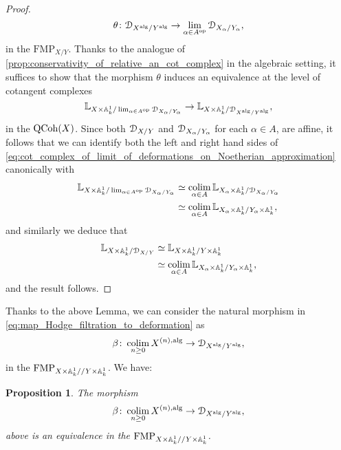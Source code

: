 \documentclass[10pt,a4paper,reqno]{amsart} %
\theoremstyle{plain}
\newtheorem{prop}[thm]{Proposition}
\theoremstyle{definition}
\theoremstyle{remark}
\numberwithin{equation}{section}
\begin{document}
\begin{proof}
        \[\theta \colon \mathcal D_{X^\mathrm{alg}/ Y^\mathrm{alg}} \to \lim_{\alpha \in A^\mathrm{op}} \mathcal D_{X_\alpha/ Y_\alpha},\]
    in the \infcat $\mathrm{FMP}_{X/ Y}$. Thanks to the analogue of \cref{prop:conservativity_of_relative_an_cot_complex} in the algebraic setting, it suffices to show that
    the morphism $\theta$ induces an equivalence at the level of cotangent complexes
        \begin{equation} \label{eq:cot_complex_of_limit_of_deformations_on_Noetherian_approximation}
            \mathbb L_{X \times \mathbb A^1_k / \lim_{\alpha \in A^\mathrm{op}} \mathcal D_{X_\alpha/ Y_\alpha}} \to \mathbb L_{X \times \mathbb A^1_k/ \mathcal D_{X^\mathrm{alg}/ Y^\mathrm{alg}}},
        \end{equation}
    in the \infcat $\mathrm{QCoh}(X)$. Since both $\mathcal D_{X/ Y}$ and $\mathcal D_{X_\alpha/ Y_\alpha}$ for each $\alpha \in A$, are affine, it follows that we can identify both the left and right
    hand sides of \eqref{eq:cot_complex_of_limit_of_deformations_on_Noetherian_approximation} canonically with
        \begin{align*}
            \mathbb L_{X \times \mathbb A^1_k/ \lim_{\alpha \in A^\mathrm{op}} \mathcal D_{X_\alpha/ Y_\alpha}} & \simeq \operatorname*{colim}_{\alpha \in A} \mathbb L_{X_\alpha \times \mathbb A^1_k/ \mathcal D_{X_\alpha/ Y_\alpha}} \\
                                                                                      & \simeq  \operatorname*{colim}_{\alpha \in A} \mathbb L_{X_\alpha \times \mathbb A^1_k/ Y_\alpha \times \mathbb A^1_k},
        \end{align*}
    and similarly we deduce that 
        \begin{align*}
            \mathbb L_{X \times \mathbb A^1_k/ \mathcal D_{X/ Y}} & \simeq \mathbb L_{X \times \mathbb A^1_k/ Y \times \mathbb A^1_k}  \\
                                                 & \simeq \operatorname*{colim}_{\alpha \in A} \mathbb L_{X_\alpha \times \mathbb A^1_k/ Y_\alpha \times \mathbb A^1_k},
        \end{align*}
    and the result follows.
\end{proof}

Thanks to the above Lemma, we can consider the natural morphism in \eqref{eq:map_Hodge_filtration_to_deformation} as
    \[
        \beta \colon \operatorname*{colim}_{n \ge 0} X^{(n), \mathrm{alg}} \to \mathcal D_{X^\mathrm{alg}/ Y^\mathrm{alg}}  ,
    \]
in the \infcat $\mathrm{FMP}_{X \times \mathbb A^1_k/ /Y\times \mathbb A^1_k}$. We have:

\begin{prop} \label{prop:colim_n_ge_0_X^n_to_deformation_is_an_equivalence}
    The morphism
        \[
            \beta \colon \operatorname*{colim}_{n \ge 0} X^{(n), \mathrm{alg}} \to \mathcal D_{X^\mathrm{alg}/ Y^\mathrm{alg}},  
        \]
    above is an equivalence in the \infcat $\mathrm{FMP}_{X \times \mathbb A^1_k/ /Y \times \mathbb A^1_k}$.
\end{prop}
\end{document}
